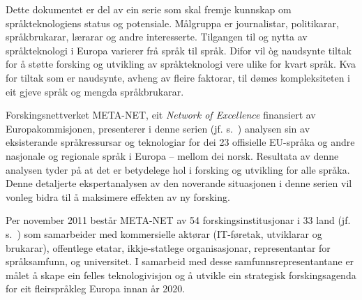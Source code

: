 Dette dokumentet er del av ein serie som skal fremje kunnskap om språkteknologiens status og potensiale. Målgruppa er journalistar, politikarar, språkbrukarar, lærarar og andre interesserte. Tilgangen til og nytta av språkteknologi i Europa varierer frå språk til språk. Difor vil òg naudsynte tiltak for å støtte forsking og utvikling av språkteknologi vere ulike for kvart språk. Kva for tiltak som er naudsynte, avheng av fleire faktorar, til dømes kompleksiteten i eit gjeve språk og mengda språkbrukarar.

Forskingsnettverket META-NET, eit \emph{Network of Excellence} finansiert av Europakommisjonen, presenterer i denne serien  (jf. s.~\pageref{whitepaperseries}) analysen sin av eksisterande språkressursar og teknologiar for dei 23 offisielle EU-språka og andre nasjonale og regionale språk i Europa -- mellom dei norsk. Resultata av denne analysen tyder på at det er betydelege hol i forsking og utvikling for alle språka. Denne detaljerte ekspertanalysen av den noverande situasjonen i denne serien vil vonleg bidra til å maksimere effekten av ny forsking.

Per november 2011 består META-NET av 54 forskingsinstitusjonar i 33 land (jf. s.~\pageref{metanetmembers}) som samarbeider med kommersielle aktørar (IT-føretak, utviklarar og brukarar), offentlege etatar, ikkje-statlege organisasjonar, representantar for språksamfunn, og universitet. I samarbeid med desse samfunnsrepresentantane er målet å skape ein felles teknologivisjon og å utvikle ein strategisk forskingsagenda for eit fleirspråkleg Europa innan år 2020.
